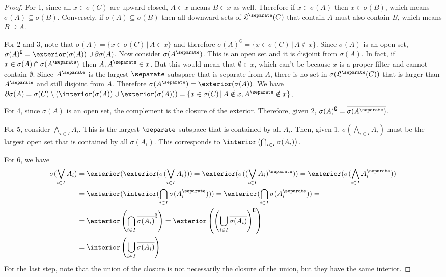 	\begin{proof}
		For 1, since all $x \in \sigma(C)$ are upward closed, $A \in x$ means $B \in x$ as well. Therefore if $x \in \sigma(A)$ then $x \in \sigma(B)$, which means $\sigma(A) \subseteq \sigma(B)$. Conversely, if $\sigma(A) \subseteq \sigma(B)$ then all downward sets of $\mathfrak{L}^\separate(C)$ that contain $A$ must also contain $B$, which means $B \supseteq A$.
		
		For 2 and 3, note that $\sigma(A) = \{ x \in \sigma(C) \, | \, A \in x \}$ and therefore $\sigma(A)^{\complement} = \{ x \in \sigma(C) \, | \, A \notin x \}$. Since $\sigma(A)$ is an open set, $\sigma(A)^{\complement} = \exterior(\sigma(A)) \cup \partial \sigma(A)$. Now consider $\sigma(A^{\separate})$. This is an open set and it is disjoint from $\sigma(A)$. In fact, if $x \in \sigma(A) \cap \sigma(A^{\separate})$ then $A, A^{\separate} \in x$. But this would mean that $\emptyset \in x$, which can't be because $x$ is a proper filter and cannot contain $\emptyset$. Since $A^{\separate}$ is the largest $\separate$-subspace that is separate from $A$, there is no set in $\sigma(\mathfrak{L}^\separate(C))$ that is larger than $A^{\separate}$ and still disjoint from $A$. Therefore $\sigma(A^{\separate}) = \exterior(\sigma(A))$. We have $\partial \sigma(A) = \sigma(C) \setminus (\interior(\sigma(A))\cup\exterior(\sigma(A))) = \{ x \in \sigma(C) \, | \, A \notin x, A^{\separate} \notin x \}$.
		
		For 4, since $\sigma(A)$ is an open set, the complement is the closure of the exterior. Therefore, given 2, $\sigma(A)^{\complement} = \overline{\sigma(A^{\separate})}$.
		
		For 5, consider $\bigwedge_{i \in I} A_i$. This is the largest $\separate$-subspace that is contained by all $A_i$. Then, given 1, $\sigma\left(\bigwedge_{i \in I} A_i\right)$ must be the largest open set that is contained by all $\sigma(A_i)$. This corresponds to $\interior\left(\bigcap_{i \in I} \sigma(A_i)\right)$.
		
		For 6, we have
		\begin{align*}
			\sigma(\bigvee_{i \in I} A_i) &= \exterior(\exterior(\sigma(\bigvee_{i \in I} A_i))) = \exterior(\sigma((\bigvee_{i \in I} A_i)^{\separate})) = \exterior(\sigma(\bigwedge_{i \in I} A_i^{\separate})) \\
			&= \exterior(\interior(\bigcap_{i \in I} \sigma(A_i^{\separate}))) = \exterior(\bigcap_{i \in I} \sigma(A_i^{\separate})) =  \\
			&= \exterior\left(\bigcap_{i \in I}\overline{\sigma(A_i)}^{\complement}\right) = \exterior\left(\left(\bigcup_{i \in I}\overline{\sigma(A_i)}\right)^{\complement}\right) \\
			&= \interior\left(\bigcup_{i \in I}\overline{\sigma(A_i)}\right)
		\end{align*}
		For the last step, note that the union of the closure is not necessarily the closure of the union, but they have the same interior.
		

\end{proof}
